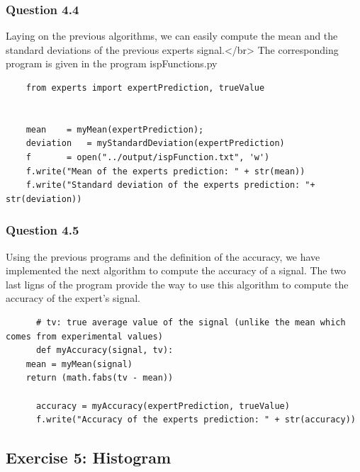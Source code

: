 \documentclass[a4paper,10pt]{article}
\begin{document}
	\subsubsection{Question 4.4}
	    Laying on the previous algorithms, we can easily compute the mean and the standard deviations of the previous experts signal.</br>
	    The corresponding program is given in the program ispFunctions.py
	    \begin{lstlisting}
    from experts import expertPrediction, trueValue


    mean	= myMean(expertPrediction);
    deviation	= myStandardDeviation(expertPrediction)
    f		= open("../output/ispFunction.txt", 'w')
    f.write("Mean of the experts prediction: " + str(mean))
    f.write("Standard deviation of the experts prediction: "+ str(deviation))
	    \end{lstlisting}

	\subsubsection{Question 4.5}
	    Using the previous programs and the definition of the accuracy, we have implemented the next algorithm to compute the accuracy of a signal.
	    The two last ligns of the program provide the way to use this algorithm to compute the accuracy of the expert's signal.
	    \begin{lstlisting}
      # tv: true average value of the signal (unlike the mean which comes from experimental values)
      def myAccuracy(signal, tv):
	mean = myMean(signal)
	return (math.fabs(tv - mean))
	
      accuracy = myAccuracy(expertPrediction, trueValue)
      f.write("Accuracy of the experts prediction: " + str(accuracy))

	    \end{lstlisting}

    \subsection{Exercise 5: Histogram }
\end{document}
